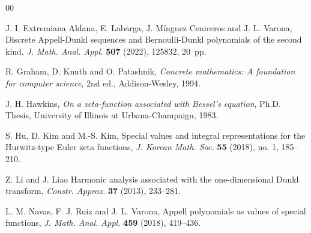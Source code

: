 \documentclass[a4paper]{amsart}
\theoremstyle{plain}
\theoremstyle{definition}
\theoremstyle{remark}
\numberwithin{equation}{section}
\begin{document}
\begin{thebibliography}{00}

J. I. Extremiana Aldana, E. Labarga, J. Mínguez Ceniceros and J. L. Varona, 
Discrete Appell-Dunkl sequences and Bernoulli-Dunkl polynomials of the second kind, 
\textit{J. Math. Anal. Appl.} \textbf{507} (2022), 125832, 20~pp. 

R. Graham, D. Knuth and O. Patashnik, 
\textit{Concrete mathematics: A foundation for computer science}, 
2nd ed., Addison-Wesley, 1994.




J. H. Hawkins, 
\textit{On a zeta-function associated with Bessel's equation}, 
Ph.D. Thesis, University of Illinois at Urbana-Champaign, 1983. 

S. Hu, D. Kim and M.-S. Kim, 
Special values and integral representations for the Hurwitz-type Euler zeta functions,
\textit{J. Korean Math. Soc.} 
\textbf{55} (2018), no. 1, 185--210.



Z. Li and J. Liao %
Harmonic analysis associated with the one-dimensional Dunkl transform,
\textit{Constr. Approx.} \textbf{37} (2013), 233--281.

L. M. Navas, F. J. Ruiz and J. L. Varona,
Appell polynomials as values of special functions,
\textit{J. Math. Anal. Appl.}
\textbf{459} (2018), 419--436.


\end{thebibliography}
\end{document}
